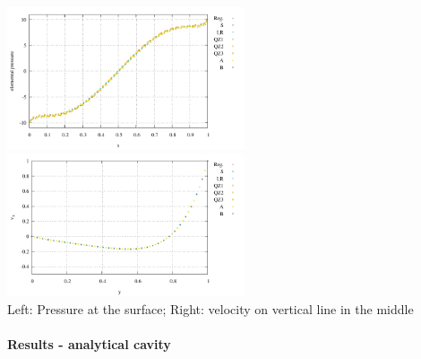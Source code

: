 \begin{center}
\includegraphics[width=7cm]{python_codes/fieldstone_78/results/ldc/32x32/prop}
\includegraphics[width=7cm]{python_codes/fieldstone_78/results/ldc/32x32/vel_profile}\\
{\captionfont Left: Pressure at the surface; Right: velocity on vertical line in the middle}
\end{center}

\newpage
\paragraph{Results - analytical cavity}

